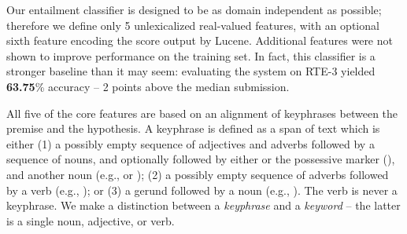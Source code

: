 %
%
Our entailment classifier is designed to be as domain independent as possible;
  therefore we define only 5 unlexicalized real-valued features, with an 
  optional sixth feature encoding the score output by Lucene.
Additional features were not shown to improve performance on the training set.
In fact, this classifier is a stronger baseline than it may seem: evaluating
  the system on RTE-3 \cite{key:2007giampiccolo-rte} yielded \textbf{63.75}\% accuracy --
  2 points above the median submission.

All five of the core features are based on an alignment of keyphrases between the
  premise and the hypothesis.
A keyphrase is defined as a span of text which is either
  (1) a possibly empty sequence of adjectives and adverbs followed by a 
      sequence of nouns, and optionally followed by either  or the possessive
      marker (), and another noun (e.g.,  or );
  (2) a possibly empty sequence of adverbs followed by a verb (e.g.,
      ); or
  (3) a gerund followed by a noun (e.g., ).
The verb  is never a keyphrase.
We make a distinction between a \textit{keyphrase} and a \textit{keyword} --
  the latter is a single noun, adjective, or verb.

